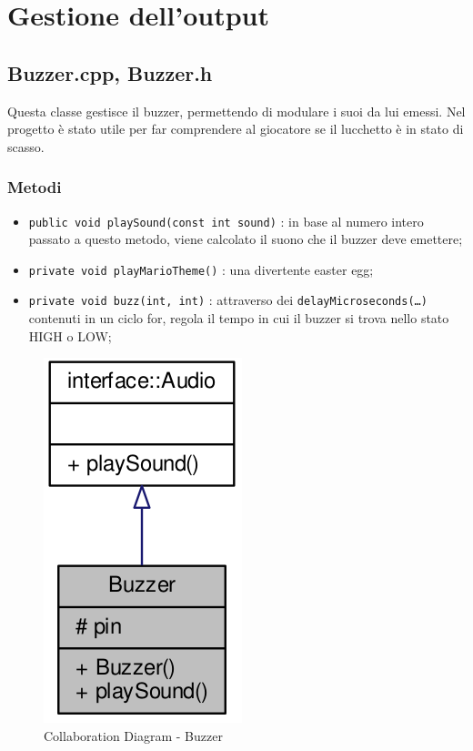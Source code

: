 \newpage
\section{Gestione dell'output}
\subsection{Buzzer.cpp, Buzzer.h}
Questa classe gestisce il buzzer, permettendo di modulare i suoi da lui emessi. Nel progetto è stato utile per far comprendere al giocatore se il lucchetto è in stato di scasso.
\subsubsection{Metodi}
\begin{itemize}
	\item \texttt{public void playSound(const int sound)} : in base al numero intero passato a questo metodo, viene calcolato il suono che il buzzer deve emettere;
	\item \texttt{private void playMarioTheme()} : una divertente easter egg;
	\item \texttt{private void buzz(int, int)} : attraverso dei \texttt{delayMicroseconds(\dots)} contenuti in un ciclo for, regola il tempo in cui il buzzer si trova nello stato HIGH o LOW;
\end{itemize}
\begin{figure}[!ht]
	\centering
	\includegraphics[scale=.35]{img/UML/CollaborationDiagram/Buzzer.png}
	\caption{Collaboration Diagram - Buzzer}
\end{figure}
